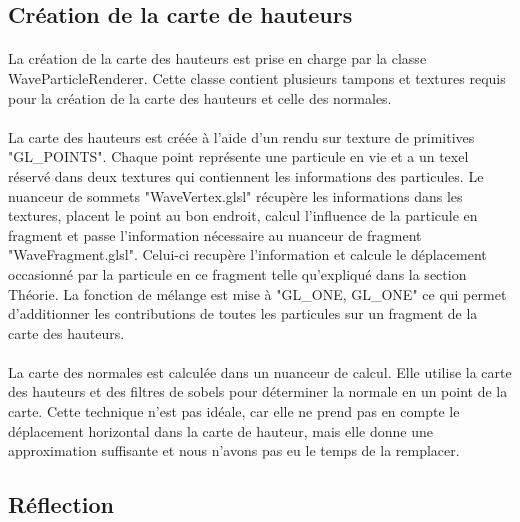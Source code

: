 \documentclass[a4paper, 12pt]{article} %
\begin{document}
\subsection{Création de la carte de hauteurs}
	\paragraph{}
	La création de la carte des hauteurs est prise en charge par la classe WaveParticleRenderer. Cette classe contient plusieurs tampons et textures requis
	pour la création de la carte des hauteurs et celle des normales.
	
	\paragraph{}
	La carte des hauteurs est créée à l'aide d'un rendu sur texture de primitives "GL\_POINTS". Chaque point représente une particule en vie et a un texel réservé
	dans deux textures qui contiennent les informations des particules. Le nuanceur de sommets "WaveVertex.glsl" récupère les informations dans les textures, 
	placent le point au bon endroit, calcul l'influence de la particule en fragment et passe l'information nécessaire au nuanceur de fragment "WaveFragment.glsl".
	Celui-ci recupère l'information et calcule le déplacement occasionné par la particule en ce fragment telle qu'expliqué dans la section Théorie. La fonction 
	de mélange est mise à "GL\_ONE, GL\_ONE" ce qui permet d'additionner les contributions de toutes les particules sur un fragment de la carte des hauteurs.

	\paragraph{}
	La carte des normales est calculée dans un nuanceur de calcul. Elle utilise la carte des hauteurs et des filtres de sobels pour déterminer la normale en
	un point de la carte. Cette technique n'est pas idéale, car elle ne prend pas en compte le déplacement horizontal dans la carte de hauteur, mais elle donne
	une approximation suffisante et nous n'avons pas eu le temps de la remplacer. 
\subsection{Réflection}
\end{document}
